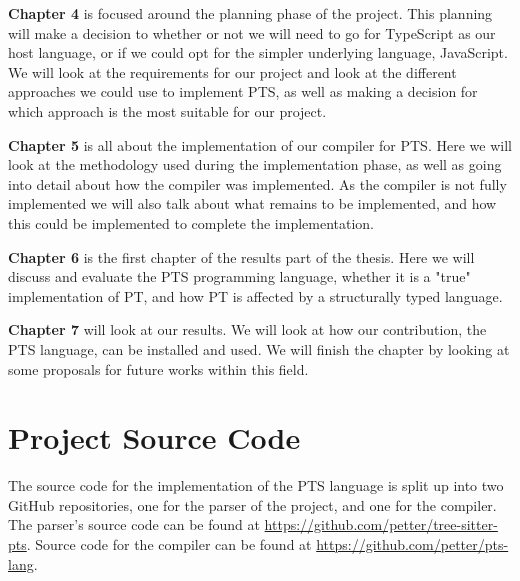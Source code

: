 \textbf{Chapter 4} is focused around the planning phase of the project.
This planning will make a decision to whether or not we will need to go for TypeScript as our host language, or if we could opt for the simpler underlying language, JavaScript.
We will look at the requirements for our project and look at the different approaches we could use to implement PTS, as well as making a decision for which approach is the most suitable for our project.

\textbf{Chapter 5} is all about the implementation of our compiler for PTS\@.
Here we will look at the methodology used during the implementation phase, as well as going into detail about how the compiler was implemented.
As the compiler is not fully implemented we will also talk about what remains to be implemented, and how this could be implemented to complete the implementation.

\textbf{Chapter 6} is the first chapter of the results part of the thesis.
Here we will discuss and evaluate the PTS programming language, whether it is a "true" implementation of PT, and how PT is affected by a structurally typed language.

\textbf{Chapter 7} will look at our results.
We will look at how our contribution, the PTS language, can be installed and used.
We will finish the chapter by looking at some proposals for future works within this field.

\section{Project Source Code}\label{sec:project-source-code}

The source code for the implementation of the PTS language is split up into two GitHub repositories, one for the parser of the project, and one for the compiler.
The parser's source code can be found at \url{https://github.com/petter/tree-sitter-pts}.
Source code for the compiler can be found at \url{https://github.com/petter/pts-lang}.
